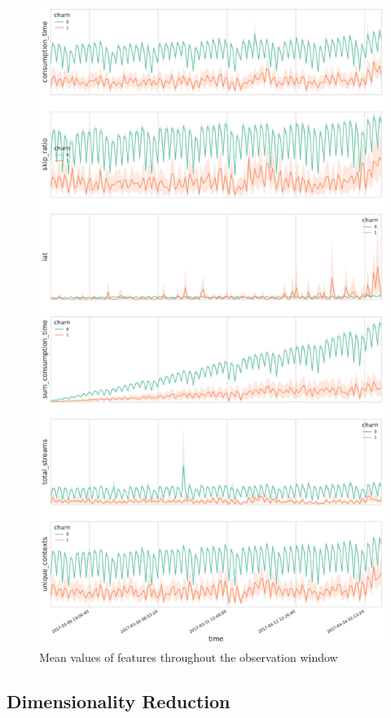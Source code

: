 \documentclass{kththesis}
\begin{document}
	\begin{figure}[h]
    \centering
    \includegraphics[width=1.0\textwidth,height=1.0\textheight,keepaspectratio]{figures/feats_time.pdf}
    \caption{Mean values of features throughout the observation window}
    \label{fig:featstime}
	\end{figure}


\subsection{Dimensionality Reduction}
\end{document}
